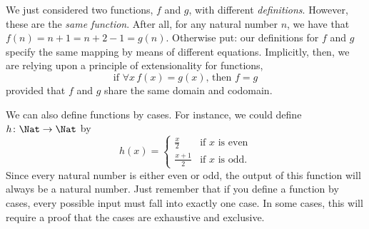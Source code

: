 \documentclass[../../../include/open-logic-section]{subfiles}
\begin{document}
\begin{explain}
We just considered two functions, $f$ and $g$, with different \emph{definitions}. However, these are the \emph{same function}. After all, for any natural number $n$, we have that $f(n) = n+1 = n+2-1 = g(n)$. Otherwise put: our  definitions for $f$ and $g$ specify the same mapping by means of different equations. Implicitly, then, we are relying upon a principle of extensionality for functions, 
$$\text{if }\forall x\, f(x) = g(x)\text{, then }f = g$$
provided that $f$ and $g$ share the same domain and codomain.
\end{explain}
\begin{ex}
We can also define functions by cases. For instance, we could define
$h \colon \Nat \to \Nat$  by
\[
h(x) =
\begin{cases}
  \frac{x}{2} & \text{if $x$ is even} \\
  \frac{x+1}{2} & \text{if $x$ is odd.}
\end{cases}
\]
Since every natural number is either even or odd, the output of this
function will always be a natural number. Just remember that if you
define a function by cases, every possible input must fall into
exactly one case.  In some cases, this will require a proof that the
cases are exhaustive and exclusive.
\end{ex}
\end{document}
